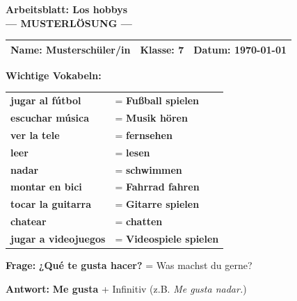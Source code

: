 \documentclass[11pt, a4paper]{article}
\newcommand{\fachfarbe}{spanisch}
\newcommand{\thema}{Los hobbys}
\newcommand{\klasse}{7}
\newcommand{\datum}{\today}
\newcommand{\loesung}[1]{\textcolor{loesung}{\textbf{#1}}}
\newcommand{\es}[1]{\textcolor{\fachfarbe}{\textbf{#1}}}
\begin{document}

\begin{center}
    {\Large\bfseries\textcolor{\fachfarbe}{Arbeitsblatt: \thema}}\\[0.3em]
    {\large\textcolor{loesung}{\textbf{--- MUSTERLÖSUNG ---}}}
\end{center}

\vspace{5pt}

\noindent
\begin{tabularx}{\textwidth}{|X|X|X|}
\hline
\textbf{Name:} \textcolor{loesung}{Musterschüler/in} &
\textbf{Klasse:} \klasse &
\textbf{Datum:} \datum \\
\hline
\end{tabularx}

\vspace{15pt}


\begin{merkkasten}
\textbf{Wichtige Vokabeln:}

\vspace{0.5em}

\begin{tabular}{ll}
\es{jugar al fútbol} & = \loesung{Fußball spielen} \\[0.8em]
\es{escuchar música} & = \loesung{Musik hören} \\[0.8em]
\es{ver la tele} & = \loesung{fernsehen} \\[0.8em]
\es{leer} & = \loesung{lesen} \\[0.8em]
\es{nadar} & = \loesung{schwimmen} \\[0.8em]
\es{montar en bici} & = \loesung{Fahrrad fahren} \\[0.8em]
\es{tocar la guitarra} & = \loesung{Gitarre spielen} \\[0.8em]
\es{chatear} & = \loesung{chatten} \\[0.8em]
\es{jugar a videojuegos} & = \loesung{Videospiele spielen} \\
\end{tabular}

\vspace{0.5em}

\textbf{Frage:} \es{¿Qué te gusta hacer?} = Was machst du gerne?

\textbf{Antwort:} \es{Me gusta} + Infinitiv (z.B. \textit{Me gusta nadar.})

\end{merkkasten}
\end{document}
